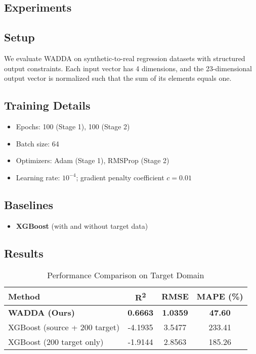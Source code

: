 \documentclass{article}
\begin{document}
\begin{itemize}
\section{Experiments}

\subsection{Setup}
We evaluate WADDA on synthetic-to-real regression datasets with structured output constraints. Each input vector has 4 dimensions, and the 23-dimensional output vector is normalized such that the sum of its elements equals one.

\subsection{Training Details}
\begin{itemize}
  \item Epochs: 100 (Stage 1), 100 (Stage 2)
  \item Batch size: 64
  \item Optimizers: Adam (Stage 1), RMSProp (Stage 2)
  \item Learning rate: $10^{-4}$; gradient penalty coefficient $c = 0.01$
\end{itemize}

\subsection{Baselines}
\begin{itemize}
  \item \textbf{XGBoost} (with and without target data)
\end{itemize}

\subsection{Results}

\begin{table}[H]
\centering
\caption{Performance Comparison on Target Domain}
\begin{tabular}{|l|c|c|c|}
\hline
\textbf{Method} & \textbf{R\textsuperscript{2}} & \textbf{RMSE} & \textbf{MAPE (\%)} \\
\hline
\textbf{WADDA (Ours)} & \textbf{0.6663} & \textbf{1.0359} & \textbf{47.60} \\
XGBoost (source + 200 target) & -4.1935 & 3.5477 & 233.41 \\
XGBoost (200 target only) & -1.9144 & 2.8563 & 185.26 \\
\hline
\end{tabular}
\label{tab:performance}
\end{table}


\end{itemize}
\end{document}
